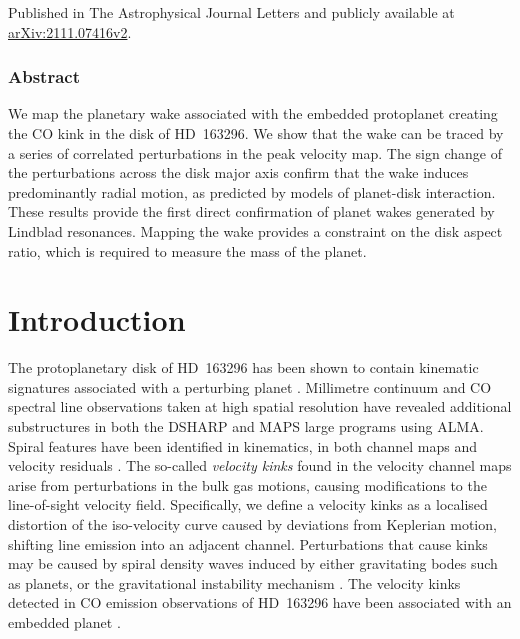 Published in The Astrophysical Journal Letters \citep{calcino2022} and publicly available at \href{https://arxiv.org/abs/2111.07416v2}{\url{arXiv:2111.07416v2}}.

\subsubsection{Abstract}

We map the planetary wake associated with the embedded protoplanet creating the CO kink in the disk of HD~163296. We show that the wake can be traced by a series of correlated perturbations in the peak velocity map. The sign change of the perturbations across the disk major axis confirm that the wake induces predominantly radial motion, as predicted by models of planet-disk interaction. These results provide the first direct confirmation of planet wakes generated by Lindblad resonances. Mapping the wake provides a constraint on the disk aspect ratio, which is required to measure the mass of the planet.

\section{Introduction}

The protoplanetary disk of HD~163296 has been shown to contain kinematic signatures associated with a perturbing planet \citep{pinte2018a,teague2018}.
Millimetre continuum and CO spectral line observations taken at high spatial resolution have revealed additional substructures in both the DSHARP \citep{andrews2018,huang2018b,pinte2020,izquierdo2021} and MAPS \citep{oberg2021,teague2021} large programs using ALMA.
Spiral features have been identified in kinematics, in both channel maps and velocity residuals \citep{teague2021}.
The so-called \textit{velocity kinks} found in the velocity channel maps arise from perturbations in the bulk gas motions, causing modifications to the line-of-sight velocity field.
Specifically, we define a velocity kinks as a localised distortion of the iso-velocity curve caused by deviations from Keplerian motion, shifting line emission into an adjacent channel.
Perturbations that cause kinks may be caused by spiral density waves induced by either gravitating bodes such as planets, or the gravitational instability mechanism \citep{hall2020}.
The velocity kinks detected in CO emission observations of HD~163296 have been associated with an embedded planet \citep{pinte2018a}.

